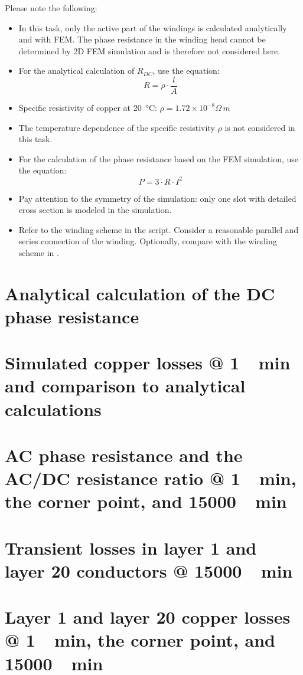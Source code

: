 Please note the following:
\begin{itemize}
	\item In this task, only the active part of the windings is calculated analytically and with FEM. The phase resistance in the winding head cannot be determined by 2D \gls{FEM} simulation and is therefore not considered here.
	\item For the analytical calculation of $R_{DC}$, use the equation:
	\begin{equation}
		R = \rho \cdot \frac{l}{A}
	\end{equation}

	\item Specific resistivity of copper at \SI{20}{\celsius}: $\rho = 1.72 \times 10^{-8} \Omega\,m$
	\item The temperature dependence of the specific resistivity $\rho$ is not considered in this task.
	\item For the calculation of the phase resistance based on the FEM simulation, use the equation:
	\begin{equation}
		P = 3 \cdot R \cdot I^2
	\end{equation}

	\item Pay attention to the symmetry of the simulation: only one slot with detailed cross section is modeled in the simulation.
	\item Refer to the winding scheme in the script. Consider a reasonable parallel and series connection of the winding. Optionally, compare with the winding scheme in \cite{DoppelbauerHEF}.
\end{itemize}

\newpage

\section{Analytical calculation of the DC phase resistance}

\section{Simulated copper losses @ \SI{1}{\per\minute} and comparison to analytical calculations}

\section{AC phase resistance and the AC/DC resistance ratio @ \SI{1}{\per\minute}, the corner point, and \SI{15000}{\per\minute}}

\section{Transient losses in layer 1 and layer 20 conductors @ \SI{15000}{\per\minute}}

\section{Layer 1 and layer 20 copper losses @ \SI{1}{\per\minute}, the corner point, and \SI{15000}{\per\minute}}